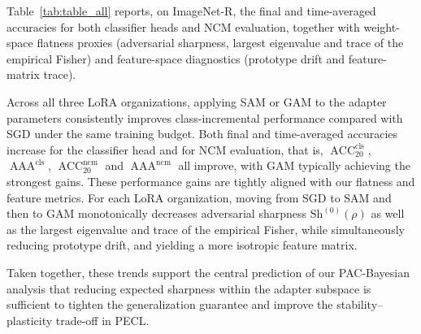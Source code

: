 \documentclass{article}
\theoremstyle{plain}
\theoremstyle{definition}
\theoremstyle{remark}
\begin{document}
Table~\ref{tab:table_all} reports, on ImageNet-R, the final and time-averaged accuracies for both classifier heads and NCM evaluation, together with weight-space flatness proxies (adversarial sharpness, largest eigenvalue and trace of the empirical Fisher) and feature-space diagnostics (prototype drift and feature-matrix trace). 


Across all three LoRA organizations, applying SAM or GAM to the adapter parameters consistently improves class-incremental performance compared with SGD under the same training budget. Both final and time-averaged accuracies increase for the classifier head and for NCM evaluation, that is, $\operatorname{ACC}_{20}^{\mathrm{cls}}$, $\operatorname{AAA}^{\mathrm{cls}}$, $\operatorname{ACC}_{20}^{\mathrm{ncm}}$ and $\operatorname{AAA}^{\mathrm{ncm}}$ all improve, with GAM typically achieving the strongest gains. 
These performance gains are tightly aligned with our flatness and feature metrics. For each LoRA organization, moving from SGD to SAM and then to GAM monotonically decreases adversarial sharpness $\mathrm{Sh}^{(0)}(\rho)$ as well as the largest eigenvalue and trace of the empirical Fisher, while simultaneously reducing prototype drift, and yielding a more isotropic feature matrix. 

Taken together, these trends support the central prediction of our PAC-Bayesian analysis that reducing expected sharpness within the adapter subspace is sufficient to tighten the generalization guarantee and improve the stability–plasticity trade-off in PECL.
\end{document}
